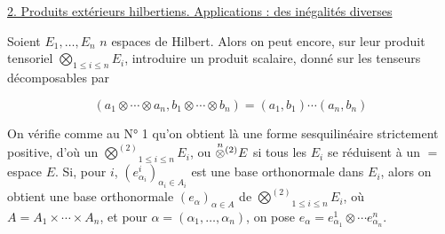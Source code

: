 \uline{2. Produits extérieurs hilbertiens. Applications : des inégalités diverses}

Soient $E_1,\ldots,E_n$ $n$ espaces de Hilbert. Alors on peut
encore, sur leur produit tensoriel $\bigotimes_{1\leq i\leq n}E_i$, introduire
un produit scalaire, donné sur les tenseurs décomposables
par

\[
(a_1\otimes\cdots\otimes a_n,b_1\otimes\cdots\otimes b_n)=(a_1,b_1)\cdots(a_n,b_n) \tag*{(1)}
\]

On vérifie comme au N° 1 qu'on obtient là une
forme sesquilinéaire  strictement positive,  d'où un
$\overset{(2)}{\bigotimes}_{1\leq i\leq n}E_i$, ou $\overset{n}{\otimes}\vphantom{\otimes}^{(2)}E$ si tous les $E_i$ se réduisent
à un $=$ espace $E$. Si, pour  $i$,
$(e^i_{\alpha_i})_{\alpha_i\in A_i}$ est une base orthonormale dans $E_i$,
alors on obtient une base orthonormale
$(e_\alpha)_{\alpha\in A}$ de $\overset{(2)}{\bigotimes}_{1\leq i\leq n}E_i$, où $A=A_1\times\cdots\times A_n$,
et pour $\alpha=(\alpha_1,\ldots,\alpha_n)$, on pose $e_\alpha=e^1_{\alpha_1}\otimes\cdots e^n_{\alpha_n}$.


